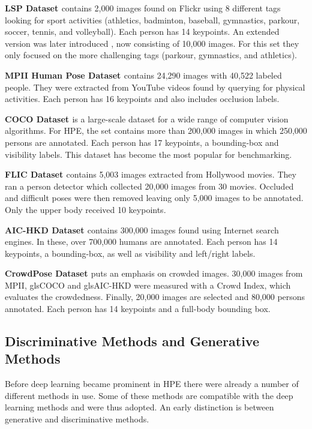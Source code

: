 \textbf{\gls{LSP} Dataset \cite{Johnson2010}} contains 2,000 images found on Flickr using 8 different tags looking for sport activities (athletics, badminton, baseball, gymnastics, parkour, soccer, tennis, and volleyball).
Each person has 14 keypoints.
An extended version was later introduced \cite{Johnson2011}, now consisting of 10,000 images. 
For this set they only focused on the more challenging tags (parkour, gymnastics, and athletics).

\textbf{\gls{MPII} Human Pose Dataset \cite{Andriluka2014}} contains 24,290 images with 40,522 labeled people.
They were extracted from YouTube videos found by querying for physical activities.
Each person has 16 keypoints and also includes occlusion labels.

\textbf{\gls{COCO} Dataset \cite{Lin2014}} is a large-scale dataset for a wide range of computer vision algorithms.
For \gls{HPE}, the set contains more than 200,000 images in which 250,000 persons are annotated.
Each person has 17 keypoints, a bounding-box and visibility labels.
This dataset has become the most popular for benchmarking.

\textbf{\gls{FLIC} Dataset \cite{Sap2013}} contains 5,003 images extracted from Hollywood movies.
They ran a person detector which collected 20,000 images from 30 movies.
Occluded and difficult poses were then removed leaving only 5,000 images to be annotated.
Only the upper body received 10 keypoints.

\textbf{\gls{AIC-HKD} Dataset \cite{Sap2013}} contains 300,000 images found using Internet search engines.
In these, over 700,000 humans are annotated.
Each person has 14 keypoints, a bounding-box, as well as visibility and left/right labels.

\textbf{CrowdPose Dataset \cite{Li2018}} puts an emphasis on crowded images.
30,000 images from \gls{MPII}, gls{COCO} and gls{AIC-HKD} were measured with a Crowd Index, which evaluates the crowdedness.
Finally, 20,000 images are selected and 80,000 persons annotated.
Each person has 14 keypoints and a full-body bounding box.


\subsection{Discriminative Methods and Generative Methods}
Before deep learning became prominent in \gls{HPE} there were already a number of different methods in use.
Some of these methods are compatible with the deep learning methods and were thus adopted.
An early distinction is between generative and discriminative methods.

